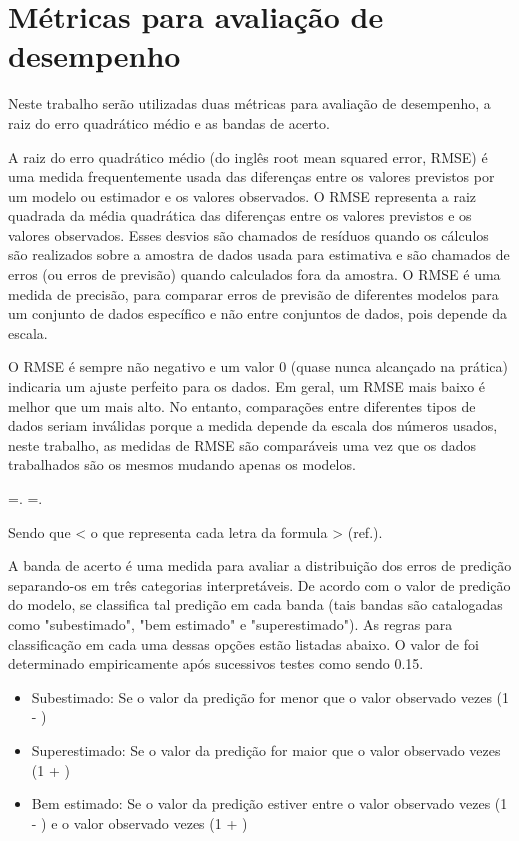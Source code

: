 \section{Métricas para avaliação de desempenho}
\label{sec:metricas_avaliacao}

Neste trabalho serão utilizadas duas métricas para avaliação de desempenho, a raiz do erro quadrático médio e as bandas de acerto.

A raiz do erro quadrático médio (do inglês root mean squared error, RMSE) é uma medida frequentemente usada das diferenças entre os valores previstos por um modelo ou estimador e os valores observados. O RMSE representa a raiz quadrada da média quadrática das diferenças entre os valores previstos e os valores observados. Esses desvios são chamados de resíduos quando os cálculos são realizados sobre a amostra de dados usada para estimativa e são chamados de erros (ou erros de previsão) quando calculados fora da amostra. O RMSE é uma medida de precisão, para comparar erros de previsão de diferentes modelos para um conjunto de dados específico e não entre conjuntos de dados, pois depende da escala.

O RMSE é sempre não negativo e um valor 0 (quase nunca alcançado na prática) indicaria um ajuste perfeito para os dados. Em geral, um RMSE mais baixo é melhor que um mais alto. No entanto, comparações entre diferentes tipos de dados seriam inválidas porque a medida depende da escala dos números usados, neste trabalho, as medidas de RMSE são comparáveis uma vez que os dados trabalhados são os mesmos mudando apenas os modelos.

{\displaystyle {} ={}.}{\displaystyle {} ={}.}

Sendo que < o que representa cada letra da formula > (ref.).

A banda de acerto é uma medida para avaliar a distribuição dos erros de predição separando-os em três categorias interpretáveis. De acordo com o valor de predição do modelo, se classifica tal predição em cada banda (tais bandas são catalogadas como "subestimado", "bem estimado" e "superestimado"). As regras para classificação em cada uma dessas opções estão listadas abaixo. O valor de \delta foi determinado empiricamente após sucessivos testes como sendo 0.15.

\begin{itemize}
	\item Subestimado: Se o valor da predição for menor que o valor observado vezes (1 - \delta)
	\item Superestimado: Se o valor da predição for maior que o valor observado vezes (1 + \delta)
	\item Bem estimado: Se o valor da predição estiver entre o valor observado vezes (1 - \delta) e o valor observado vezes (1 + \delta)
\end{itemize}


